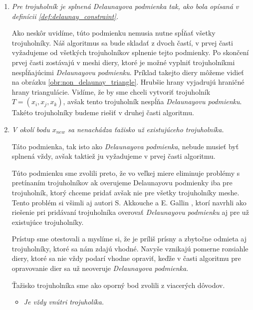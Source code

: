 \begin{enumerate}
     \item{
         \textit{Pre trojuholník je splnená \textit{Delaunayova podmienka} tak, ako bola opísaná v 
         definícii \ref{def:delaunay_constraint}.}

        Ako neskôr uvidíme, túto podmienku nemusia nutne spĺňať všetky trojuholníky. Náš algoritmus sa bude 
        skladať z dvoch častí, v prvej časti vyžadujeme od všetkých trojuholníkov splnenie tejto podmienky.
        Po skončení prvej časti zostávajú v meshi diery, ktoré je možné vyplniť trojuholníkmi nespĺňajúcimi 
        \textit{Delaunayovu podmienku}. Príklad takejto diery môžeme vidieť na obrázku 
        \ref{obr:non_delaunay_triangle}. Hrubšie hrany vyjadrujú hraničné hrany triangulácie. 
        Vidíme, že by sme chceli vytvoriť trojuholník $T = (x_i, x_j, x_k)$,
        avšak tento trojuholník nespĺňa \textit{Delaunayovu podmienku}. Takéto trojuholníky
        budeme riešiť v druhej časti algoritmu.
     }

     \item{
         \textit{V okolí bodu $x_{new}$ sa nenachádza ťažisko už existujúceho trojuholníka.}

         Táto podmienka, tak isto ako \textit{Delaunayova podmienka}, nebude musieť byť splnená vždy,
         avšak taktiež ju vyžadujeme v prvej časti algoritmu. 
         
         Túto podmienku sme zvolili preto, že vo veľkej miere eliminuje problémy s pretínaním 
         trojuholníkov ak overujeme Delaunayovu podmienky iba pre trojuholník, ktorý chceme pridať 
         avšak nie pre všetky trojuholníky meshe. Tento problém si všimli aj autori S. Akkouche a 
         E. Gallin \cite{akkouche2001adaptive}, ktorí navrhli ako riešenie pri pridávaní trojuholníka 
         overovať \textit{Delaunayovu podmienku} aj pre už existujúce trojuholníky. 
         
         Prístup sme otestovali a myslíme si, že je príliš prísny a zbytočne odmieta aj trojuholníky, 
         ktoré sa nám zdajú vhodné. Navyše vznikajú pomerne rozsiahle diery, ktoré sa nie vždy podarí 
         vhodne opraviť, keďže v časti algoritmu pre opravovanie dier sa už neoveruje
         \textit{Delaunayova podmienka}.

         Ťažisko trojuholníka sme ako oporný bod zvolili z viacerých dôvodov.
         \begin{itemize}
            \item{
                \textit{Je vždy vnútri trojuholíka.}

}
\end{itemize}}
\end{enumerate}
